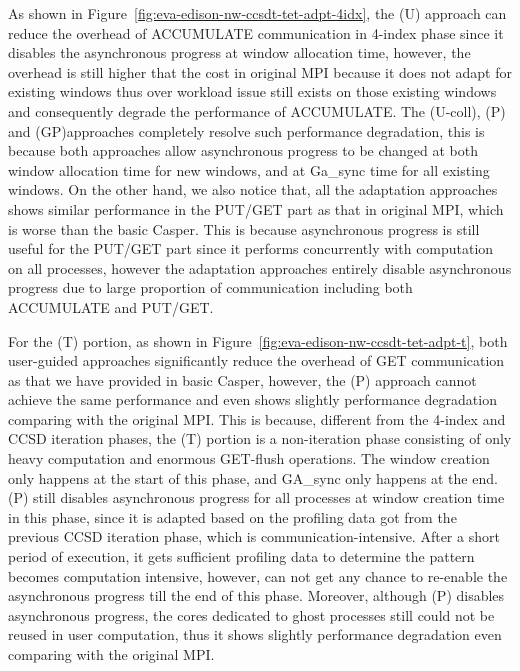 As shown in Figure~\ref{fig:eva-edison-nw-ccsdt-tet-adpt-4idx},
the \libname(U) approach can reduce the overhead of ACCUMULATE communication
in 4-index phase since it disables the asynchronous progress at window
allocation time, however, the overhead is still higher that the cost in
original MPI because it does not adapt for existing windows thus over
workload issue still exists on those existing windows and consequently
degrade the performance of ACCUMULATE.
The \libname(U-coll), \libname(P) and \libname(GP)approaches completely
resolve such performance degradation, this is because
both approaches allow asynchronous progress to be changed at both
window allocation time for new windows, and at Ga\_sync time for all
existing windows.
On the other hand, we also notice that, all the adaptation approaches shows
similar performance in the PUT/GET part as that in original MPI, which is
worse than the basic Casper. This is because asynchronous progress is
still useful for the PUT/GET part since it performs concurrently with
computation on all processes, however the adaptation approaches entirely
disable asynchronous progress due to large proportion of communication
including both ACCUMULATE and PUT/GET.

For the (T) portion, as shown in
Figure~\ref{fig:eva-edison-nw-ccsdt-tet-adpt-t}, both user-guided
approaches significantly reduce the overhead of GET communication
as that we have provided in basic Casper, however, the \libname(P)
approach cannot achieve the same performance and even shows slightly
performance degradation comparing with the original MPI. This is because,
different from the 4-index and CCSD iteration phases,
the (T) portion is a non-iteration phase consisting of only heavy
computation and enormous GET-flush operations. The window creation
only happens at the start of this phase, and GA\_sync only happens
at the end. \libname(P) still disables asynchronous progress for all
processes at window creation time in this phase, since it is adapted
based on the profiling data got from the previous CCSD iteration
phase, which is communication-intensive. After a short period of
execution, it gets sufficient profiling data to determine the pattern
becomes computation intensive, however, can not get any chance to
re-enable the asynchronous progress till the end of this phase.
Moreover, although \libname(P) disables asynchronous progress,
the cores dedicated to ghost processes still could not be reused in
user computation, thus it shows slightly performance degradation even
comparing with the original MPI.

